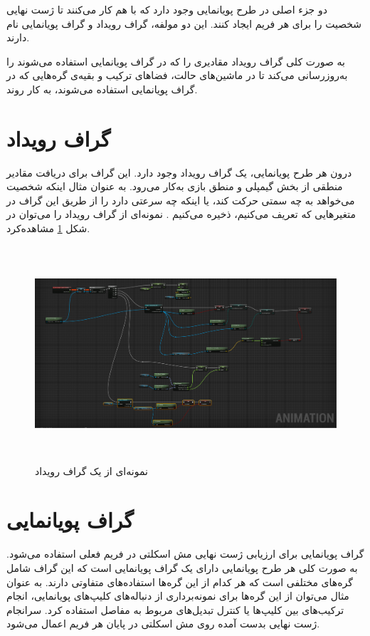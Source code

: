 دو جزء اصلی در طرح پویانمایی وجود دارد که با هم کار می‌کنند تا ژست نهایی شخصیت را برای هر 
فریم ایجاد کنند.
این دو مولفه، گراف رویداد و گراف پویانمایی نام دارند.

به صورت کلی گراف رویداد مقادیری را که در گراف پویانمایی استفاده می‌شوند را به‌روز‌رسانی می‌‌کند تا 
در ماشین‌های حالت، فضاهای ترکیب و بقیه‌ی گره‌هایی که در گراف پویانمایی
 استفاده می‌شوند، به کار روند.

\section{گراف رویداد}

درون هر طرح پویانمایی، یک گراف رویداد وجود دارد. 
این گراف برای دریافت مقادیر منطقی از بخش گیمپلی و منطق بازی به‌کار می‌رود.
به عنوان مثال اینکه شخصیت می‌خواهد به چه سمتی حرکت کند، یا اینکه چه سرعتی دارد را 
از طریق این گراف در متغیرهایی که تعریف می‌کنیم، ذخیره می‌کنیم \cite{EventGraphUnrealEngine}.
نمونه‌ای از گراف رویداد را می‌توان در شکل 
\ref{fig:EventGraph}
مشاهده‌کرد.

\begin{figure}[ht]
	\centerline{\includegraphics[width=\textwidth,height=8cm,keepaspectratio]{Figures/Ch3/EventGraph.png}}

	\caption{نمونه‌ای از یک گراف رویداد}
	\label{fig:EventGraph}
\end{figure}


\section{گراف پویا‌نمایی}

گراف پویانمایی برای ارزیابی ژست نهایی مش اسکلتی در فریم فعلی استفاده می‌شود.
به صورت کلی هر طرح پویانمایی دارای یک گراف پویانمایی است که 
این گراف شامل گره‌های مختلفی است که هر کدام از این گره‌ها استفاده‌های متفاوتی دارند.
به عنوان مثال می‌توان از این گره‌ها برای نمونه‌برداری
از دنباله‌های کلیپ‌های پویانمایی،
انجام ترکیب‌های بین کلیپ‌ها 
یا کنترل تبدیل‌های مربوط به مفاصل استفاده کرد.
سرانجام ژست نهایی بدست آمده روی 
مش اسکلتی در پایان هر فریم اعمال می‌شود.

